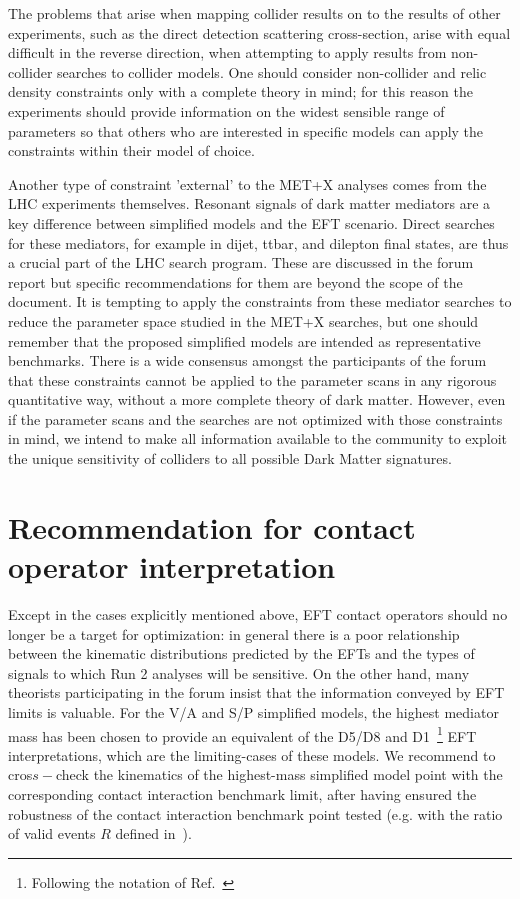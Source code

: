 \documentclass[a4,debug,notitlepage,nobib]{tufte-handout}
\begin{document}
The problems that arise when mapping collider results on to the
results of other experiments, such as the direct detection scattering
cross-section, arise with equal difficult in the reverse direction,
when attempting to apply results from non-collider searches to
collider models. One should consider non-collider and relic density
constraints only with a complete theory in mind; for this reason the
experiments should provide information on the widest sensible range of
parameters so that others who are interested in specific models can
apply the constraints within their model of choice.

Another type of constraint 'external' to the MET+X analyses comes from
the LHC experiments themselves. Resonant signals of dark matter
mediators are a key difference between simplified models and the EFT
scenario. Direct searches for these mediators, for example in dijet,
ttbar, and dilepton final states, are thus a crucial part of the LHC
search program. These are discussed in the forum report but specific
recommendations for them are beyond the scope of the document.  It is
tempting to apply the constraints from these mediator searches to
reduce the parameter space studied in the MET+X searches, but one
should remember that the proposed simplified models are intended as
representative benchmarks. There is a wide consensus amongst the
participants of the forum that these constraints cannot be applied to
the parameter scans in any rigorous quantitative way, without a more
complete theory of dark matter. However, even if the parameter scans
and the searches are not optimized with those constraints in mind, 
we intend to make all information available to the community to exploit
the unique sensitivity of colliders to all possible 
Dark Matter signatures. 

\section{Recommendation for contact operator interpretation}
\label{sec:eft}

Except in the cases explicitly mentioned above, EFT contact operators
should no longer be a target for optimization: in general there is a
poor relationship between the kinematic distributions predicted by the
EFTs and the types of signals to which Run 2 analyses will be
sensitive. On the other hand, many theorists participating in the
forum insist that the information conveyed by EFT limits is
valuable. %
For the V/A and S/P simplified models, the highest mediator mass has
been chosen to provide an equivalent of the D5/D8 and D1~\footnote{Following 
the notation of Ref.~\cite{Goodman:2010ku}} EFT interpretations, 
which are the limiting-cases of these models. 
We recommend to cros$s-$check the kinematics of the highest-mass simplified model point 
with the corresponding contact interaction benchmark limit, after having ensured 
the robustness of the contact interaction benchmark point tested (e.g. with the ratio 
of valid events $R$ defined in~\cite{Aad:2015zva}). 
\end{document}
